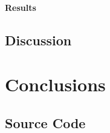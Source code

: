 \documentclass[11pt,a4paper]{report}
\begin{document}
				
				\subsubsection{Results}
		
		\section{Discussion}
		
	\chapter{Conclusions}
	
	
	
	\nocite{*}
	
	\begin{appendices}
		\chapter{Source Code}
	\end{appendices}
\end{document}

